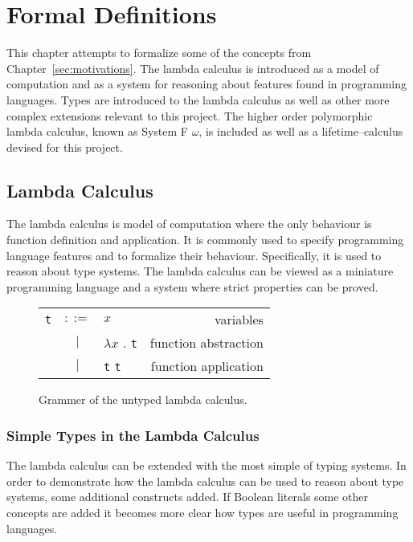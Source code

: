 \chapter{Formal Definitions}\label{sec:formal}
This chapter attempts to formalize some of the concepts from Chapter~\ref{sec:motivations}.
The lambda calculus is introduced as a model of computation and as a system for
reasoning about features found in programming languages. Types are introduced
to the lambda calculus as well as other more complex extensions relevant to
this project. The higher order polymorphic lambda calculus, known as
System F $\omega$, is included as well as a lifetime--calculus devised for this
project.

\section{Lambda Calculus}\label{sec:lambda-calc}
The lambda calculus is model of computation where the only behaviour is
function definition and application. It is commonly used to specify programming
language features and to formalize their behaviour. Specifically, it is used to
reason about type systems. The lambda calculus can be viewed as a miniature
programming language and a system where strict properties can be proved.

\begin{figure}[H]\label{fig:lambdaCalc}
    \centering
    \begin{tabular}{l c p{3cm} r}
        \texttt{t} & $ ::= $ & $ x $ &                   variables \\
      & $ | $ & $ \lambda x $ . \texttt{t} &          function abstraction \\
      & $ | $ & \texttt{t} \texttt{t} &          function application \\
    \end{tabular}
    \caption{Grammer of the untyped lambda calculus.}
\end{figure}

\subsection{Simple Types in the Lambda Calculus}
The lambda calculus can be extended with the most simple of typing systems.
In order to demonstrate how the lambda calculus can be used to reason about
type systems, some additional constructs added. If Boolean literals some other
concepts are added it becomes more clear how types are useful in programming
languages.

